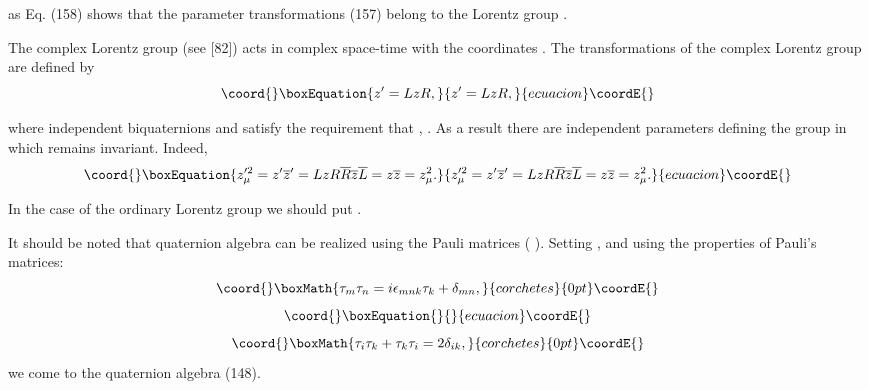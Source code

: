 \documentclass[a4paper,12pt]{article}
\begin{document}
as \coordHE{} Eq. (158)
shows that the \coordHE{}parameter transformations (157) belong to the
Lorentz group \coordHE{}.

The complex Lorentz group \coordHE{} (see [82]) acts in complex
space-time with the coordinates \coordHE{}. The
transformations of the complex Lorentz group are defined by
\begin{equation}\coord{}\boxEquation{
z^{\prime }=LzR,  \label{159}
}{
z^{\prime }=LzR,  }{ecuacion}\coordE{}\end{equation}

where independent biquaternions \coordHE{} and \coordHE{} satisfy the
requirement that \coordHE{}, \coordHE{}. As a
result there are \coordHE{} independent parameters defining the
\coordHE{} group in which remains \coordHE{} invariant. Indeed,
\begin{equation}\coord{}\boxEquation{
z_\mu ^{\prime 2}=z^{\prime }\overline{z}^{\prime
}=LzR\overline{R}\overline{ z}\overline{L}=z\overline{z}=z_\mu ^2.
\label{160}
}{
z_\mu ^{\prime 2}=z^{\prime }\overline{z}^{\prime
}=LzR\overline{R}\overline{ z}\overline{L}=z\overline{z}=z_\mu ^2.
}{ecuacion}\coordE{}\end{equation}

In the case of the ordinary Lorentz group we should put \coordHE{}.

It should be noted that quaternion algebra can be realized using
the Pauli \coordHE{}matrices \coordHE{} (\coordHE{}  \coordHE{}  \coordHE{}).
Setting \coordHE{}, \coordHE{} and using the properties of
Pauli's matrices:
\[\coord{}\boxMath{
\tau _m\tau _n=i\epsilon _{mnk}\tau _k+\delta _{mn},
}{corchetes}{0pt}\coordE{}\]
\vspace{-8mm}
\begin{equation}\coord{}\boxEquation{  \label{161}
}{  }{ecuacion}\coordE{}\end{equation}
\vspace{-8mm}
\[\coord{}\boxMath{
\tau _i\tau _k+\tau _k\tau _i=2\delta _{ik},
}{corchetes}{0pt}\coordE{}\]
we come to the quaternion algebra (148).
\end{document}
